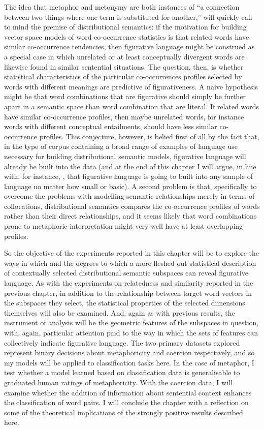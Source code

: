 The idea that metaphor and metonymy are both instances of ``a connection between two things where one term is substituted for another,'' \citep[][p. 260]{Gibbs1993} will quickly call to mind the premise of distributional semantics: if the motivation for building vector space models of word co-occurrence statistics is that related words have similar co-occurrence tendencies, then figurative language might be construed as a special case in which unrelated or at least conceptually divergent words are likewise found in similar sentential situations.  The question, then, is whether statistical characteristics of the particular co-occurrences profiles selected by words with different meanings are predictive of figurativeness.  A naive hypothesis might be that word combinations that are figurative should simply be further apart in a semantic space than word combination that are literal.  If related words have similar co-occurrence profiles, then maybe unrelated words, for instance words with different conceptual entailments, should have less similar co-occurrence profiles.  This conjecture, however, is belied first of all by the fact that, in the type of corpus containing a broad range of examples of language use necessary for building distributional semantic models, figurative language will already be built into the data (and at the end of this chapter I will argue, in line with, for instance, \cite{Gibbs1994}, that figurative language is going to built into any sample of language no matter how small or basic).  A second problem is that, specifically to overcome the problems with modelling semantic relationships merely in terms of collocations, distributional semantics compares the co-occurrence profiles of words rather than their direct relationships, and it seems likely that word combinations prone to metaphoric interpretation might very well have at least overlapping profiles.

So the objective of the experiments reported in this chapter will be to explore the ways in which and the degrees to which a more fleshed out statistical description of contextually selected distributional semantic subspaces can reveal figurative language.  As with the experiments on relatedness and similarity reported in the previous chapter, in addition to the relationship between target word-vectors in the subspaces they select, the statistical properties of the selected dimensions themselves will also be examined.  And, again as with previous results, the instrument of analysis will be the geometric features of the subspaces in question, with, again, particular attention paid to the way in which the sets of features can collectively indicate figurative language.  The two primary datasets explored represent binary decisions about metaphoricity and coercion respectively, and so my models will be applied to classification tasks here.  In the case of metaphor, I test whether a model learned based on classification data is generalisable to graduated human ratings of metaphoricity.  With the coercion data, I will examine whether the addition of information about sentential context enhances the classification of word pairs.  I will conclude the chapter with a reflection on some of the theoretical implications of the strongly positive results described here.

